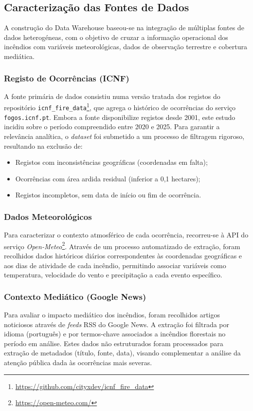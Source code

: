 \subsection{Caracterização das Fontes de Dados}
A construção do Data Warehouse baseou-se na integração de múltiplas fontes de dados heterogéneas, com o objetivo de cruzar a informação operacional dos incêndios com variáveis meteorológicas, dados de observação terrestre e cobertura mediática.

\subsubsection{Registo de Ocorrências (ICNF)}
A fonte primária de dados consistiu numa versão tratada dos registos do repositório \texttt{icnf\_fire\_data}\footnote{\url{https://github.com/cityxdev/icnf_fire_data}}, que agrega o histórico de ocorrências do serviço \texttt{fogos.icnf.pt}.
Embora a fonte disponibilize registos desde 2001, este estudo incidiu sobre o período compreendido entre 2020 e 2025. Para garantir a relevância analítica, o \textit{dataset} foi submetido a um processo de filtragem rigoroso, resultando na exclusão de:
\begin{itemize}
	\item Registos com inconsistências geográficas (coordenadas em falta);
	\item Ocorrências com área ardida residual (inferior a 0,1 hectares);
	\item Registos incompletos, sem data de início ou fim de ocorrência.
\end{itemize}

\subsubsection{Dados Meteorológicos}
Para caracterizar o contexto atmosférico de cada ocorrência, recorreu-se à API do serviço \textit{Open-Meteo}\footnote{\url{https://open-meteo.com/}}. Através de um processo automatizado de extração, foram recolhidos dados históricos diários correspondentes às coordenadas geográficas e aos dias de atividade de cada incêndio, permitindo associar variáveis como temperatura, velocidade do vento e precipitação a cada evento específico.

\subsubsection{Contexto Mediático (Google News)}
Para avaliar o impacto mediático dos incêndios, foram recolhidos artigos noticiosos através de \textit{feeds} RSS do Google News. A extração foi filtrada por idioma (português) e por termos-chave associados a incêndios florestais no período em análise.
Estes dados não estruturados foram processados para extração de metadados (título, fonte, data), visando complementar a análise da atenção pública dada às ocorrências mais severas.


